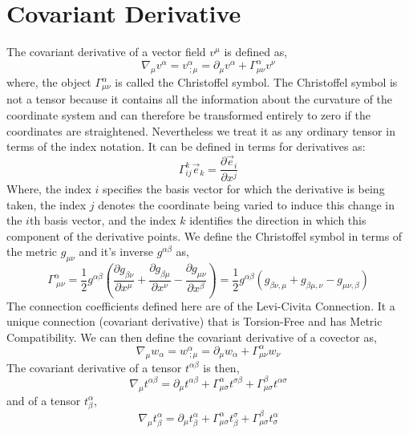 \section{Covariant Derivative}
The covariant derivative of a vector field $v^{\mu}$ is defined as,
\begin{equation}
\nabla_{\mu} v^{\alpha} = v^{\alpha}_{ \  ; \mu} = \partial_{\mu} v^{\alpha} + \Gamma^{\alpha}_{\mu \nu} v^{\nu}
\end{equation}
where, the object $\Gamma^{\alpha}_{\mu \nu}$ is called the Christoffel symbol. The Christoffel symbol is not a tensor because it contains all the information about the curvature of the coordinate system and can therefore be transformed entirely to zero if the coordinates are straightened. Nevertheless we treat it as any ordinary tensor in terms of the index notation. It can be defined in terms for derivatives as:
\begin{equation}
\Gamma^{k}_{ij}\vec{e}_{k} = \frac{\partial \vec{e}_{i}}{\partial x^{j}}
\end{equation}
Where, the index $i$ specifies the basis vector for which the derivative is being
taken, the index $j$ denotes the coordinate being varied to induce this change
in the $i$th basis vector, and the index $k$ identifies the direction in which this
component of the derivative points. We define the Christoffel symbol in terms of the metric $g_{\mu \nu}$ and it's inverse $g^{\alpha \beta}$ as,
\begin{equation}
\Gamma^{\alpha}_{\ \mu \nu} = \frac{1}{2} g^{\alpha \beta} \left(\frac{\partial g_{\beta \nu}}{\partial x^{\mu}} + \frac{\partial g_{\beta \mu}}{\partial x^{\nu}} - \frac{\partial g_{\mu \nu}}{\partial x^{\beta}}\right) = \frac{1}{2}g^{\alpha \beta} \left(g_{\beta \nu, \mu} + g_{\beta \mu, \nu} - g_{\mu \nu, \beta}\right)
\end{equation}
The connection coefficients defined here are of the Levi-Civita Connection. It a unique connection (covariant derivative) that is Torsion-Free and has Metric Compatibility. We can then define the covariant derivative of a covector as,
\begin{equation}
\nabla_{\mu} w_{\alpha} = w^{\alpha}_{ \  ; \mu} = \partial_{\mu} w_{\alpha} + \Gamma^{\alpha}_{\mu \nu} w_{\nu}
\end{equation}
The covariant derivative of a tensor $t^{\alpha\beta}$ is then,
\begin{equation}
\nabla_{\mu}t^{\alpha \beta} = \partial_{\mu} t^{\alpha \beta} + \Gamma^{\alpha}_{\mu \sigma}t^{\sigma \beta} + \Gamma^{\beta}_{\mu \sigma}t^{\alpha \sigma }
\end{equation}
and of a tensor $t^{\alpha}_{\beta}$,
\begin{equation}
\nabla_{\mu}t^{\alpha}_{\beta} = \partial_{\mu} t^{\alpha}_{\beta} + \Gamma^{\alpha}_{\mu \sigma}t^{\sigma}_{\beta} + \Gamma^{\beta}_{\mu \sigma}t^{\alpha}_{\sigma}
\end{equation}


